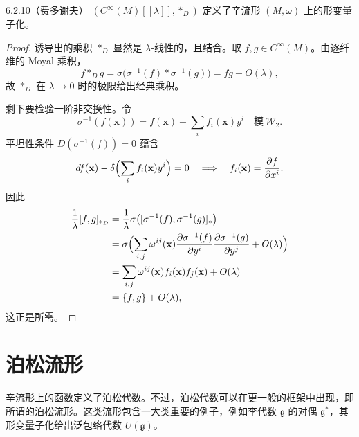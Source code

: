 
\begin{theorem}{6.2.10（费多谢夫）}
  $(C^\infty(M)[[\lambda]],\ast_D)$ 定义了辛流形 $(M,\omega)$ 上的形变量子化。
\end{theorem}

\begin{proof}
诱导出的乘积 $\ast_D$ 显然是 $\lambda$-线性的，且结合。取 $f,g\in C^\infty(M)$。由逐纤维的 Moyal 乘积，
\[
f\ast_D g=\sigma\bigl(\sigma^{-1}(f)\ast\sigma^{-1}(g)\bigr)=fg+O(\lambda),
\]
故 $\ast_D$ 在 $\lambda\to0$ 时的极限给出经典乘积。

剩下要检验一阶非交换性。令
\[
\sigma^{-1}(f(\mathbf x))=f(\mathbf x)-\sum_i f_i(\mathbf x)y^i
\quad\text{模}\ \mathcal W_2.
\]
平坦性条件 $D(\sigma^{-1}(f))=0$ 蕴含
\[
df(\mathbf x)-\delta\Bigl(\sum_i f_i(\mathbf x)y^i\Bigr)=0
\quad\Longrightarrow\quad
f_i(\mathbf x)=\frac{\partial f}{\partial x^i}.
\]
因此
\begin{align*}
\frac1\lambda[f,g]_{\ast_D}
&=\frac1\lambda\sigma\bigl([\sigma^{-1}(f),\sigma^{-1}(g)]_\ast\bigr)\\
&=\sigma\Bigl(\sum_{i,j}\omega^{ij}(\mathbf x)
\frac{\partial\sigma^{-1}(f)}{\partial y^i}
\frac{\partial\sigma^{-1}(g)}{\partial y^j}+O(\lambda)\Bigr)\\
&=\sum_{i,j}\omega^{ij}(\mathbf x)f_i(\mathbf x)f_j(\mathbf x)+O(\lambda)\\
&=\{f,g\}+O(\lambda),
\end{align*}
这正是所需。
\end{proof}


\section{泊松流形}

辛流形上的函数定义了泊松代数。不过，泊松代数可以在更一般的框架中出现，即所谓的泊松流形。这类流形包含一大类重要的例子，例如李代数 $\mathfrak g$ 的对偶 $\mathfrak g^*$，其形变量子化给出泛包络代数 $U(\mathfrak g)$。

